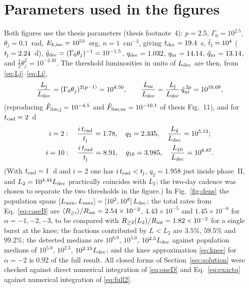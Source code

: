 \documentclass[11pt,a4paper]{article}
\newcommand{\tq}{\tilde{q}}
\newcommand{\tF}{\tilde{F}}
\newcommand{\ttj}{\tilde{t}_{\rm j}}
\newcommand{\dec}{{\rm dec}}
\newcommand{\nr}{{\rm nr}}
\newcommand{\Rint}{R_{\rm int}}
\newcommand{\tcad}{t_{\rm cad}}
\newcommand{\tdec}{t_{\rm dec}}
\newcommand{\tj}{t_{\rm j}}
\newcommand{\Ravg}{\langle R_{\geq i}\rangle}
\newcommand{\Lmin}{L_{\rm min}}
\newcommand{\Lmax}{L_{\rm max}}
\newcommand{\Ldec}{L_{\rm dec}}
\newcommand{\Lj}{L_{\rm j}}
\newcommand{\Lnr}{L_{\rm nr}}
\begin{document}
\section{Parameters used in the figures}
\label{app:params}

Both figures use the thesis parameters (thesis footnote~4): $p=2.5$, $\Gamma_0=10^{2.5}$, $\theta_j=0.1$~rad, $E_{\rm k,iso}=10^{53}$~erg, $n=1$~cm$^{-3}$, giving $\tdec=19.4$~s, $\ttj=10^4$ ($\tj=2.24$~d), $\tq_\dec=(\Gamma_0\theta_j)^{-1}=10^{-1.5}$, $q_\dec=1.032$, $q_\nr=14.14$, $\tq_\nr=13.14$, and $\tfrac12\theta_j^2=10^{-2.30}$. The threshold luminosities in units of $\Ldec$ are then, from \eqref{eq:Lj}--\eqref{eq:Li},
\[
\frac{\Lj}{\Ldec}=(\Gamma_0\theta_j)^{2(p-1)}=10^{4.50},\qquad
\frac{\Lnr}{\Ldec}=\frac{\Lj}{\Ldec}\,\tq_\nr^{\,2p}=10^{10.09},
\]
(reproducing $\tF_{\rm lim,j}=10^{-4.5}$ and $\tF_{\rm lim,nr}=10^{-10.1}$ of thesis Fig.~11), and for $\tcad=2$~d
\begin{gather*}
i=2:\quad \frac{i\,\tcad}{\tj}=1.78,\quad q_2=2.335,\quad \frac{L_2}{\Ldec}=10^{5.13};\\
i=10:\quad \frac{i\,\tcad}{\tj}=8.91,\quad q_{10}=3.985,\quad \frac{L_{10}}{\Ldec}=10^{6.87}.
\end{gather*}
(With $\tcad=1$~d and $i=2$ one has $i\,\tcad<\tj$, $q_2=1.958$ just inside phase~II, and $L_2=10^{4.44}\Ldec$ practically coincides with $\Lj$; the two-day cadence was chosen to separate the two thresholds in the figure.) In Fig.~\ref{fig:dens} the population spans $[\Lmin,\Lmax]=[10^{2},10^{8}]\,\Ldec$; the total rates from Eq.~\eqref{eq:caseB} are $\Ravg/\Rint=2.54\times10^{-2}$, $4.43\times10^{-5}$ and $1.45\times10^{-6}$ for $\alpha=-1,-2,-3$, to be compared with $R_{\geq2}(L_2)/\Rint=1.82\times10^{-2}$ for a single burst at the knee; the fractions contributed by $L<L_2$ are $3.5\%$, $59.5\%$ and $99.2\%$; the detected medians are $10^{6.9}$, $10^{5.0}$, $10^{2.5}\Ldec$ against population medians of $10^{5.0}$, $10^{2.3}$, $10^{2.15}\Ldec$; and the knee approximation \eqref{eq:knee} for $\alpha=-2$ is $0.92$ of the full result. All closed forms of Section~\ref{sec:solution} were checked against direct numerical integration of \eqref{eq:oneD} and Eq.~\eqref{eq:exactq} against numerical integration of \eqref{eq:full2}.
\end{document}
